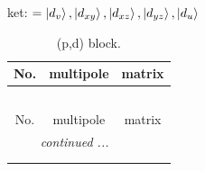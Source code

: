 \documentclass[fleqn,8pt,landscape]{jsarticle}
\begin{document}
\noindent
ket: $=\ket{d_{v}}, \ket{d_{xy}}, \ket{d_{xz}}, \ket{d_{yz}}, \ket{d_{u}}$
\renewcommand{\arraystretch}{1.6}
\begin{longtable}{ccc}
\caption{(p,d) block.}
 \\
 \hline \hline
No. & multipole & matrix \\ \hline \endfirsthead

\multicolumn{2}{l}{\tablename\ \thetable{}} \\
 \hline \hline
No. & multipole & matrix \\ \hline \endhead

 \hline \hline
\multicolumn{2}{r}{\footnotesize\it continued ...} \\ \endfoot

 \hline \hline
\multicolumn{2}{r}{} \\ \endlastfoot


\end{longtable}
\end{document}
